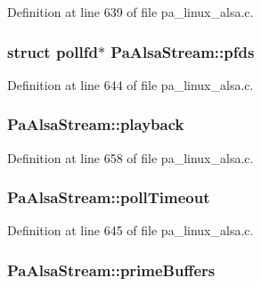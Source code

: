 Definition at line 639 of file pa\+\_\+linux\+\_\+alsa.\+c.

\subsubsection[{\texorpdfstring{pfds}{pfds}}]{\setlength{\rightskip}{0pt plus 5cm}struct pollfd$\ast$ Pa\+Alsa\+Stream\+::pfds}\hypertarget{struct_pa_alsa_stream_aa2e24a0415a19cf1e2f95dd69af76e4c}{}\label{struct_pa_alsa_stream_aa2e24a0415a19cf1e2f95dd69af76e4c}


Definition at line 644 of file pa\+\_\+linux\+\_\+alsa.\+c.

\subsubsection[{\texorpdfstring{playback}{playback}}]{ Pa\+Alsa\+Stream\+::playback}\hypertarget{struct_pa_alsa_stream_a82ea139e41016b139932dbf649c30741}{}\label{struct_pa_alsa_stream_a82ea139e41016b139932dbf649c30741}


Definition at line 658 of file pa\+\_\+linux\+\_\+alsa.\+c.

\subsubsection[{\texorpdfstring{poll\+Timeout}{pollTimeout}}]{ Pa\+Alsa\+Stream\+::poll\+Timeout}\hypertarget{struct_pa_alsa_stream_afd9058a227a6b8d8eae41f033c7955ae}{}\label{struct_pa_alsa_stream_afd9058a227a6b8d8eae41f033c7955ae}


Definition at line 645 of file pa\+\_\+linux\+\_\+alsa.\+c.

\subsubsection[{\texorpdfstring{prime\+Buffers}{primeBuffers}}]{ Pa\+Alsa\+Stream\+::prime\+Buffers}\hypertarget{struct_pa_alsa_stream_a6977d63a92f8a3e044a8c6f5e1a2cc31}{}\label{struct_pa_alsa_stream_a6977d63a92f8a3e044a8c6f5e1a2cc31}


